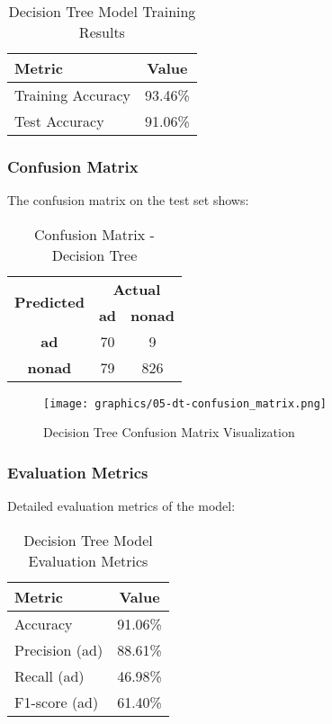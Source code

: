 \begin{table}[h]
\centering
\caption{Decision Tree Model Training Results}
\begin{tabular}{|l|c|}
\hline
\textbf{Metric} & \textbf{Value} \\
\hline
Training Accuracy & 93.46\% \\
Test Accuracy & 91.06\% \\
\hline
\end{tabular}
\end{table}

\subsubsection{Confusion Matrix}

The confusion matrix on the test set shows:

\begin{table}[h]
\centering
\caption{Confusion Matrix - Decision Tree}
\begin{tabular}{|c|c|c|}
\hline
\multirow{2}{*}{\textbf{Predicted}} & \multicolumn{2}{c|}{\textbf{Actual}} \\
\cline{2-3}
 & \textbf{ad} & \textbf{nonad} \\
\hline
\textbf{ad} & 70 & 9 \\
\hline
\textbf{nonad} & 79 & 826 \\
\hline
\end{tabular}
\end{table}

\begin{figure}[h]
\centering
\texttt{[image: graphics/05-dt-confusion\_matrix.png]}
\caption{Decision Tree Confusion Matrix Visualization}
\end{figure}

\subsubsection{Evaluation Metrics}

Detailed evaluation metrics of the model:

\begin{table}[h]
\centering
\caption{Decision Tree Model Evaluation Metrics}
\begin{tabular}{|l|c|}
\hline
\textbf{Metric} & \textbf{Value} \\
\hline
Accuracy & 91.06\% \\
Precision (ad) & 88.61\% \\
Recall (ad) & 46.98\% \\
F1-score (ad) & 61.40\% \\
\hline
\end{tabular}
\end{table}

